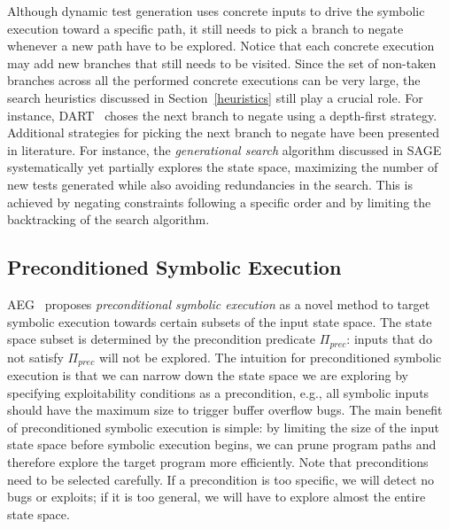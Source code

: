 Although dynamic test generation uses concrete inputs to drive the symbolic execution toward a specific path, it still needs to pick a branch to negate whenever a new path have to be explored. Notice that each concrete execution may add new branches that still needs to be visited. Since the set of non-taken branches across all the performed concrete executions can be very large, the search heuristics discussed in Section~\ref{heuristics} still play a crucial role. For instance, {\sc DART}~\cite{DART-PLDI05} choses the next branch to negate using a depth-first strategy. Additional strategies for picking the next branch to negate have been presented in literature. For instance, the {\em generational search} algorithm discussed in {\sc SAGE}~\cite{SAGE-NDSS08} systematically yet partially explores the state space, maximizing the number of new tests generated while also avoiding redundancies in the search. This is achieved by negating constraints following a specific order and by limiting the backtracking of the search algorithm.




\subsection{Preconditioned Symbolic Execution}
\label{precontioned-symbolic-execution}

{\sc AEG}~\cite{AEG-NDSS11} proposes {\em preconditional symbolic execution} as a novel method to target symbolic execution towards certain subsets of the input state space. The state space subset is determined by the precondition predicate $\Pi_{prec}$: inputs that do not satisfy $\Pi_{prec}$ will not be explored. The intuition for preconditioned symbolic execution is that we can narrow down the state space we are exploring by specifying exploitability conditions as a precondition, e.g., all symbolic inputs should have the maximum size to trigger buffer overflow bugs. The main benefit of preconditioned symbolic execution is simple: by limiting the size of the input state space before symbolic execution begins, we can prune program paths and therefore explore the target program more efficiently.
Note that preconditions need to be selected carefully. If a precondition is too specific, we will detect no bugs or exploits; if it is too general, we will have to explore almost the entire state space. %

